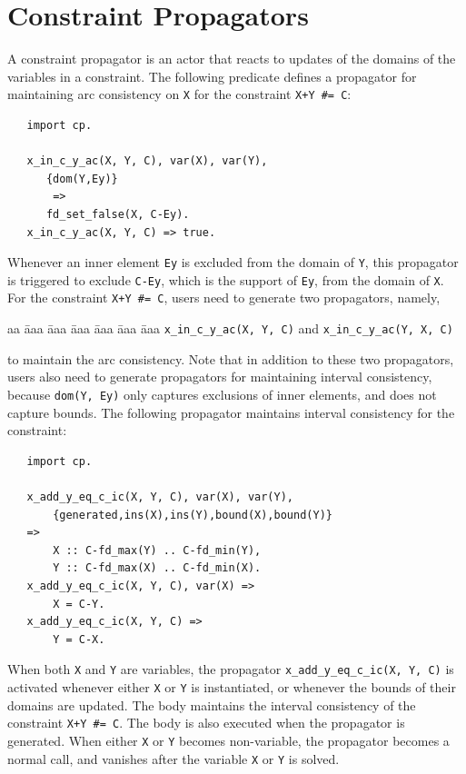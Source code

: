 \section{Constraint Propagators}
A constraint propagator is an actor that reacts to updates of the domains of the variables in a constraint. The following predicate defines a propagator for maintaining arc consistency on \texttt{X} for the constraint \verb-X+Y #= C-:
\begin{verbatim}
   import cp.

   x_in_c_y_ac(X, Y, C), var(X), var(Y),
      {dom(Y,Ey)}
       =>         
      fd_set_false(X, C-Ey).
   x_in_c_y_ac(X, Y, C) => true.
\end{verbatim}
Whenever an inner element \texttt{Ey} is excluded from the domain of \texttt{Y}, this propagator is triggered to exclude \texttt{C-Ey}, which is the support of \texttt{Ey}, from the domain of \texttt{X}. For the constraint \verb-X+Y #= C-, users need to generate two propagators, namely,
\begin{tabbing}
aa \= aaa \= aaa \= aaa \= aaa \= aaa \= aaa \kill
\> \texttt{x\_in\_c\_y\_ac(X, Y, C)} and \texttt{x\_in\_c\_y\_ac(Y, X, C)}
\end{tabbing}
to maintain the arc consistency. Note that in addition to these two propagators, users also need to generate propagators for maintaining interval consistency, because \texttt{dom(Y, Ey)} only captures exclusions of inner elements, and does not capture bounds. The following propagator maintains interval consistency for the constraint:
\begin{verbatim}
   import cp.

   x_add_y_eq_c_ic(X, Y, C), var(X), var(Y),
       {generated,ins(X),ins(Y),bound(X),bound(Y)}
   =>         
       X :: C-fd_max(Y) .. C-fd_min(Y),
       Y :: C-fd_max(X) .. C-fd_min(X).
   x_add_y_eq_c_ic(X, Y, C), var(X) =>
       X = C-Y.
   x_add_y_eq_c_ic(X, Y, C) =>
       Y = C-X.
\end{verbatim}
When both \texttt{X} and \texttt{Y} are variables, the propagator \texttt{x\_add\_y\_eq\_c\_ic(X, Y, C)} is activated whenever either \texttt{X} or \texttt{Y} is instantiated, or whenever the bounds of their domains are updated. The body maintains the interval consistency of the constraint \verb-X+Y #= C-. The body is also executed when the propagator is generated. When either \texttt{X} or \texttt{Y} becomes non-variable, the propagator becomes a normal call, and vanishes after the variable \texttt{X} or \texttt{Y} is solved.

